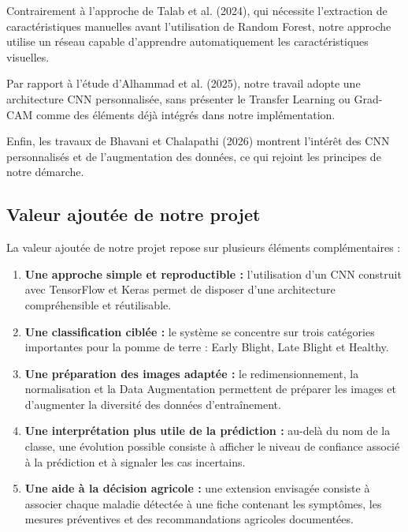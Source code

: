 \documentclass[12pt,a4paper,oneside]{report}
\begin{document}
Contrairement à l'approche de Talab et al. (2024), qui
nécessite l'extraction de caractéristiques manuelles
avant l'utilisation de Random Forest, notre approche
utilise un réseau capable d'apprendre automatiquement
les caractéristiques visuelles.

Par rapport à l'étude d'Alhammad et al. (2025), notre
travail adopte une architecture CNN personnalisée,
sans présenter le Transfer Learning ou Grad-CAM comme
des éléments déjà intégrés dans notre implémentation.

Enfin, les travaux de Bhavani et Chalapathi (2026)
montrent l'intérêt des CNN personnalisés et de
l'augmentation des données, ce qui rejoint les principes
de notre démarche.

\subsection{Valeur ajoutée de notre projet}

La valeur ajoutée de notre projet repose sur plusieurs
éléments complémentaires :

\begin{enumerate}
    \item \textbf{Une approche simple et reproductible :}
    l'utilisation d'un CNN construit avec TensorFlow
    et Keras permet de disposer d'une architecture
    compréhensible et réutilisable.

    \item \textbf{Une classification ciblée :}
    le système se concentre sur trois catégories importantes
    pour la pomme de terre : Early Blight, Late Blight
    et Healthy.

    \item \textbf{Une préparation des images adaptée :}
    le redimensionnement, la normalisation et la
    Data Augmentation permettent de préparer les images
    et d'augmenter la diversité des données d'entraînement.

    \item \textbf{Une interprétation plus utile de la prédiction :}
    au-delà du nom de la classe, une évolution possible
    consiste à afficher le niveau de confiance associé
    à la prédiction et à signaler les cas incertains.

    \item \textbf{Une aide à la décision agricole :}
    une extension envisagée consiste à associer chaque
    maladie détectée à une fiche contenant les symptômes,
    les mesures préventives et des recommandations
    agricoles documentées.
\end{enumerate}
\end{document}
